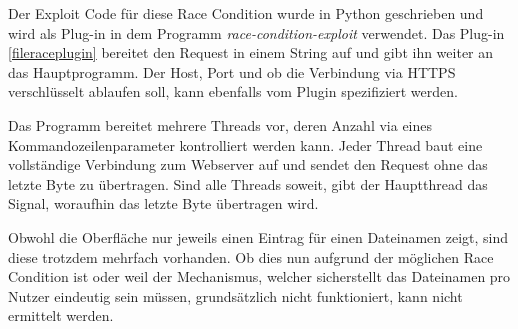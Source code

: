 \documentclass[12pt,DIV14,BCOR10mm,a4paper,parskip=half-,headsepline,headinclude,english,ngerman,bibliography=totocnumbered]{scrreprt}
\begin{document}
Der Exploit Code für diese Race Condition wurde in Python geschrieben und wird als Plug-in in dem Programm \textit{race-condition-exploit} verwendet. Das Plug-in \ref{fileraceplugin} bereitet den Request in einem String auf und gibt ihn weiter an das Hauptprogramm. Der Host, Port und ob die Verbindung via HTTPS verschlüsselt ablaufen soll, kann ebenfalls vom Plugin spezifiziert werden.

Das Programm bereitet mehrere Threads vor, deren Anzahl via eines Kommandozeilenparameter kontrolliert werden kann. Jeder Thread baut eine vollständige Verbindung zum Webserver auf und sendet den Request ohne das letzte Byte zu übertragen. Sind alle Threads soweit, gibt der Hauptthread das Signal, woraufhin das letzte Byte übertragen wird.

Obwohl die Oberfläche nur jeweils einen Eintrag für einen Dateinamen zeigt, sind diese trotzdem mehrfach vorhanden. Ob dies nun aufgrund der möglichen Race Condition ist oder weil der Mechanismus, welcher sicherstellt das Dateinamen pro Nutzer eindeutig sein müssen, grundsätzlich nicht funktioniert, kann nicht ermittelt werden.

\printbibliography

\printacronyms[title=Abkürzungsverzeichnis,toctitle=Abkürzungsverzeichnis]
\printglossary[title=Glossar,toctitle=Glossar,type=main]

\iftotalfigures
  \listoffigures
\fi

\end{document}
